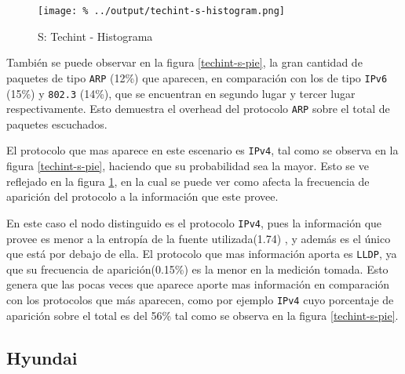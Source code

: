 \documentclass[final,inline,a4paper,narroweqnarray]{ieee}
\begin{document}
     
    \begin{figure}[ht]\begin{center}
      \texttt{[image: \%
      ../output/techint-s-histogram.png]}
      \caption{S: Techint - Histograma}
      \label{techint-s-histogram}
    \end{center}\end{figure}

    También se puede observar en la figura \ref{techint-s-pie}, la
    gran cantidad de paquetes de tipo \texttt{ARP} (12\%) que
    aparecen, en comparación con los de tipo \texttt{IPv6} (15\%) y
    \texttt{802.3} (14\%), que se encuentran en segundo lugar y tercer
    lugar respectivamente. Esto demuestra el overhead del protocolo
    \texttt{ARP} sobre el total de paquetes escuchados.

    El protocolo que mas aparece en este escenario es \texttt{IPv4}, tal
    como se observa en la figura \ref{techint-s-pie}, haciendo que 
    su probabilidad sea la
    mayor. Esto se ve reflejado en la figura \ref{techint-s-histogram},
    en la cual se puede ver como
    afecta la frecuencia de aparición del protocolo a la información
    que este provee.


    En este caso el nodo distinguido es el protocolo \texttt{IPv4}, 
    pues la información que provee es menor a la entropía de la fuente 
    utilizada(1.74) , y además es el único que está por debajo de ella. El
    protocolo que mas información aporta es \texttt{LLDP}, ya que
    su frecuencia de aparición(0.15\%) es la menor en la medición tomada. Esto
    genera que las pocas veces que aparece aporte mas información en 
    comparación con los protocolos que más aparecen, como por ejemplo 
    \texttt{IPv4} cuyo porcentaje de aparición sobre el total es del 56\%
    tal como se observa en la figura \ref{techint-s-pie}.

  \subsection{Hyundai}
\end{document}
